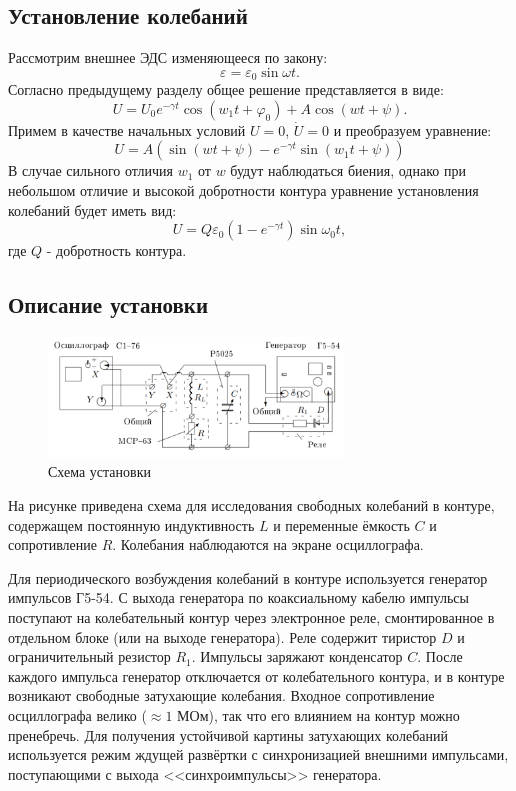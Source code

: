 \documentclass[12pt]{article}
\begin{document}
\subsection*{Установление колебаний}
Рассмотрим внешнее ЭДС изменяющееся по закону:
\[
	\varepsilon = \varepsilon_0 \sin \omega t.
\]
Согласно предыдущему разделу общее решение представляется в виде:
\[
	U = U_0 e^{-\gamma t} \cos (w_1 t + \varphi_0) + A \cos (wt + \psi).
\]
Примем в качестве начальных условий $U = 0$, $\dot{U} = 0$ и преобразуем уравнение:
\[
	U = A \left( \sin (wt + \psi) - e^{-\gamma t} \sin (w_1 t + \psi) \right)
\]
В случае сильного отличия $w_1$ от $w$ будут наблюдаться биения, однако при небольшом отличие и высокой
добротности контура уравнение установления колебаний будет иметь вид:
\begin{equation}
	U = Q \varepsilon_0 \left( 1 - e^{-\gamma t} \right) \sin \omega_0 t,
\end{equation}
где $Q$ - добротность контура.


\subsection*{Описание установки}
\begin{figure}[H]
	\centering
	\includegraphics[width=0.7\textwidth]{1.png}
	\caption{Схема установки}
	\label{pic:scheme}
\end{figure}
На рисунке приведена схема для исследования свободных колебаний в контуре, содержащем постоянную индуктивность $L$ и переменные ёмкость $C$ и сопротивление $R$. Колебания наблюдаются на экране осциллографа.

Для периодического возбуждения колебаний в контуре используется генератор импульсов Г5-54. С выхода генератора по коаксиальному кабелю импульсы поступают на колебательный контур через электронное реле, смонтированное в отдельном блоке (или на выходе генератора). Реле содержит тиристор $D$ и ограничительный резистор $R_1$.
Импульсы заряжают конденсатор $C$. После каждого импульса генератор отключается от колебательного контура, и в контуре возникают свободные затухающие колебания. Входное сопротивление осциллографа велико ($\approx 1$ МОм), так что его влиянием на контур можно пренебречь. Для получения устойчивой картины затухающих колебаний используется режим ждущей развёртки с синхронизацией внешними импульсами, поступающими с выхода <<синхроимпульсы>> генератора.
\end{document}
